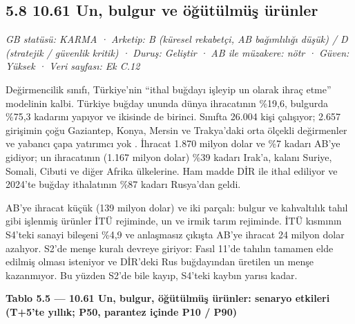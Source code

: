 \hypertarget{nace_kartlar_10-12-58-1061-un-bulgur-ve-uxf6ux11fuxfctuxfclmuxfcux15f-uxfcruxfcnler}{%
\subsection{5.8 10.61 Un, bulgur ve öğütülmüş ürünler}\label{nace_kartlar_10-12-58-1061-un-bulgur-ve-uxf6ux11fuxfctuxfclmuxfcux15f-uxfcruxfcnler}}

\emph{GB statüsü: KARMA · Arketip: B (küresel rekabetçi, AB bağımlılığı düşük) / D (stratejik / güvenlik kritik) · Duruş: Geliştir · AB ile müzakere: nötr · Güven: Yüksek · Veri sayfası: Ek C.12}

Değirmencilik sınıfı, Türkiye'nin ``ithal buğdayı işleyip un olarak ihraç etme'' modelinin kalbi. Türkiye buğday ununda dünya ihracatının \%19,6, bulgurda \%75,3 kadarını yapıyor ve ikisinde de birinci. Sınıfta 26.004 kişi çalışıyor; 2.657 girişimin çoğu Gaziantep, Konya, Mersin ve Trakya'daki orta ölçekli değirmenler ve yabancı çapa yatırımcı yok \etiketH{}. İhracat 1.870 milyon dolar ve \%7 kadarı AB'ye gidiyor; un ihracatının (1.167 milyon dolar) \%39 kadarı Irak'a, kalanı Suriye, Somali, Cibuti ve diğer Afrika ülkelerine. Ham madde DİR ile ithal ediliyor ve 2024'te buğday ithalatının \%87 kadarı Rusya'dan geldi.

AB'ye ihracat küçük (139 milyon dolar) ve iki parçalı: bulgur ve kahvaltılık tahıl gibi işlenmiş ürünler İTÜ rejiminde, un ve irmik tarım rejiminde. İTÜ kısmının S4'teki sanayi bileşeni \%4,9 ve anlaşmasız çıkışta AB'ye ihracat 24 milyon dolar azalıyor. S2'de menşe kuralı devreye giriyor: Fasıl 11'de tahılın tamamen elde edilmiş olması isteniyor ve DİR'deki Rus buğdayından üretilen un menşe kazanmıyor. Bu yüzden S2'de bile kayıp, S4'teki kaybın yarısı kadar.


\textbf{Tablo 5.5 --- 10.61 Un, bulgur, öğütülmüş ürünler: senaryo etkileri (T+5'te yıllık; P50, parantez içinde P10 / P90)}

\nopagebreak[4]

\begingroup\gbtablo\footnotesize

